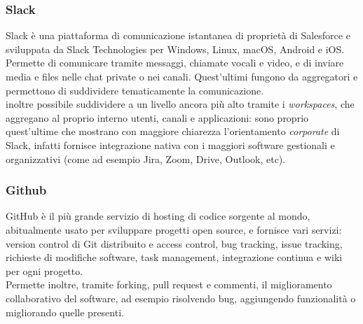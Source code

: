 \subsubsection{Slack}
Slack è una piattaforma di comunicazione istantanea di proprietà di Salesforce e sviluppata da Slack Technologies per Windows, Linux, macOS, Android e iOS.\\
Permette di comunicare tramite messaggi, chiamate vocali e video, e di inviare media e files nelle chat private o nei canali. Quest'ultimi fungono da aggregatori e permettono di suddividere tematicamente la comunicazione.\\
\E{} inoltre possibile suddividere a un livello ancora più alto tramite i \textit{workspaces}, che aggregano al proprio interno utenti, canali e applicazioni: sono proprio quest'ultime che mostrano con maggiore chiarezza l'orientamento \textit{corporate} di Slack, infatti fornisce integrazione nativa con i maggiori software gestionali e organizzativi (come ad esempio Jira, Zoom, Drive, Outlook, etc).

\subsubsection{Github}
GitHub è il più grande servizio di hosting di codice sorgente al mondo, abitualmente usato per sviluppare progetti open source, e fornisce vari servizi: version control di Git distribuito e access control, bug tracking, issue tracking, richieste di modifiche software, task management, integrazione continua e wiki per ogni progetto.\\ 
Permette inoltre, tramite forking, pull request e commenti, il miglioramento collaborativo del software, ad esempio risolvendo bug, aggiungendo funzionalità o migliorando quelle presenti.

